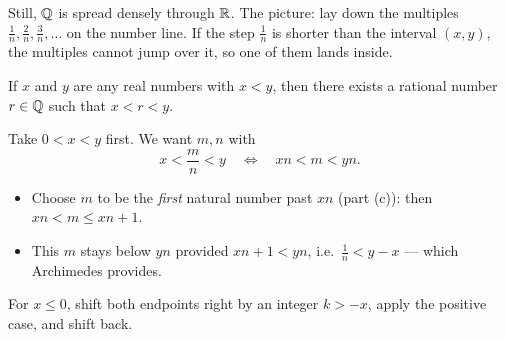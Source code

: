 Still, $\mathbb{Q}$ is spread densely through $\mathbb{R}$. The picture: lay down the multiples $\frac1n,\frac2n,\frac3n,\ldots$ on the number line. If the step $\frac1n$ is shorter than the interval $(x,y)$, the multiples cannot jump over it, so one of them lands inside.

\begin{theorem}\label{thm:density-Q}
    If $x$ and $y$ are any real numbers with $x < y$, then there exists a rational number $r \in \mathbb{Q}$ such that $x < r < y$. 
\end{theorem}

\begin{scratch}
    Take $0<x<y$ first. We want $m,n$ with
    \[
        x<\frac mn<y
        \quad\Longleftrightarrow\quad
        xn<m<yn.
    \]
    \begin{itemize}
        \item Choose $m$ to be the \emph{first} natural number past $xn$ (part (c)): then $xn<m\leq xn+1$.
        \item This $m$ stays below $yn$ provided $xn+1<yn$, i.e.\ $\frac1n<y-x$ --- which Archimedes provides.
    \end{itemize}
    For $x\leq0$, shift both endpoints right by an integer $k>-x$, apply the positive case, and shift back.
\end{scratch}
